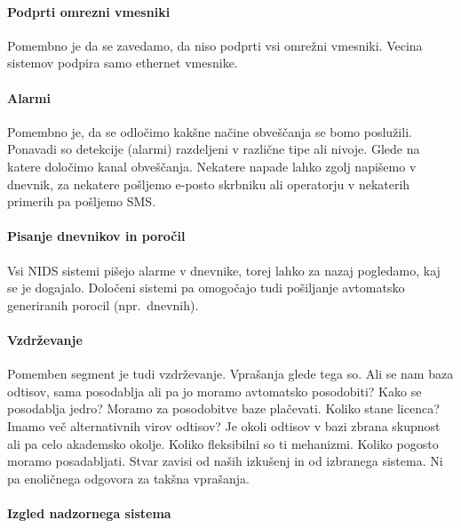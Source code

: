 \documentclass[12pt]{article}
\begin{document}

\paragraph{Podprti omrezni vmesniki} %

Pomembno je da se zavedamo, da niso podprti vsi omrežni vmesniki. Vecina sistemov podpira samo ethernet vmesnike.


\paragraph{Alarmi} %

Pomembno je, da se odločimo kakšne načine obveščanja se bomo poslužili. Ponavadi so detekcije (alarmi) razdeljeni v različne tipe ali nivoje.
Glede na katere določimo kanal obveščanja. 
Nekatere napade lahko zgolj napišemo v dnevnik, za nekatere pošljemo e-posto skrbniku ali operatorju v nekaterih primerih pa pošljemo SMS.


\paragraph{Pisanje dnevnikov in poročil} %

Vsi NIDS sistemi pišejo alarme v dnevnike, torej lahko za nazaj pogledamo, kaj se je dogajalo. Določeni sistemi pa omogočajo tudi pošiljanje avtomatsko generiranih porocil (npr.\ dnevnih).

\paragraph{Vzdrževanje} %

Pomemben segment je tudi vzdrževanje. Vprašanja glede tega so. Ali se nam baza odtisov, sama posodablja ali
pa jo moramo avtomatsko posodobiti? Kako se posodablja jedro? Moramo za posodobitve baze plačevati. Koliko stane licenca?
Imamo več alternativnih virov odtisov? Je okoli odtisov v bazi zbrana skupnost ali pa celo akademsko okolje.
Koliko fleksibilni so ti mehanizmi. Koliko pogosto moramo posadabljati. 
Stvar zavisi od naših izkušenj in od izbranega sistema. Ni pa enoličnega odgovora za takšna vprašanja.


\paragraph{Izgled nadzornega sistema} %
\end{document}
